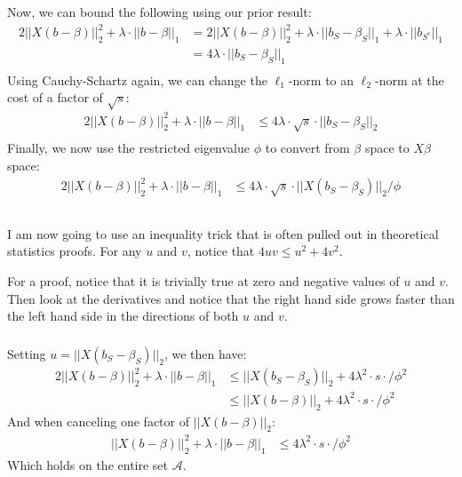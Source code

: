 \begin{frame}[fragile] \frametitle{}

Now, we can bound the following using our prior result:
\begin{align*}
2 || X ( b - \beta) ||_2^2 + \lambda \cdot || b - \beta ||_1
  &= 2 || X ( b - \beta) ||_2^2 + \lambda \cdot || b_S - \beta_S ||_1 + \lambda \cdot || b_{S^c} ||_1 \\
  &= 4 \lambda \cdot || b_S - \beta_S ||_1 \\
\end{align*}
\pause Using Cauchy-Schartz again, we can change the $\ell_1$-norm to an $\ell_2$-norm at
the cost of a factor of $\sqrt{s}$:
\begin{align*}
2 || X ( b - \beta) ||_2^2 + \lambda \cdot || b - \beta ||_1
  &\leq 4 \lambda \cdot \sqrt{s} \cdot || b_S - \beta_S ||_2 \\
\end{align*}
\pause Finally, we now use the restricted eigenvalue $\phi$ to convert from $\beta$ space
to $X \beta$ space:
\begin{align*}
2 || X ( b - \beta) ||_2^2 + \lambda \cdot || b - \beta ||_1
  &\leq 4 \lambda \cdot \sqrt{s} \cdot || X( b_S - \beta_S) ||_2 / \phi \\
\end{align*}

\end{frame}

\begin{frame}[fragile] \frametitle{}

I am now going to use an inequality trick that is often pulled out in
theoretical statistics proofs. For any $u$ and $v$, notice that
$4uv \leq u^2 + 4 v^2$.

For a proof, notice that it is trivially true at zero and negative values
of $u$ and $v$. Then look at the derivatives and notice that the right hand
side grows faster than the left hand side in the directions of both $u$ and
$v$.

\end{frame}


\begin{frame}[fragile] \frametitle{}

Setting $u = || X( b_S - \beta_S) ||_2$, we then have:
\begin{align*}
2 || X ( b - \beta) ||_2^2 + \lambda \cdot || b - \beta ||_1
  &\leq || X( b_S - \beta_S) ||_2 + 4 \lambda^2 \cdot s \cdot / \phi^2 \\
  &\leq || X( b - \beta) ||_2 + 4 \lambda^2 \cdot s \cdot / \phi^2
\end{align*}
And when canceling one factor of $|| X( b - \beta) ||_2$:
\begin{align*}
|| X ( b - \beta) ||_2^2 + \lambda \cdot || b - \beta ||_1
  &\leq 4 \lambda^2 \cdot s \cdot / \phi^2
\end{align*}
Which holds on the entire set $\mathcal{A}$.

\end{frame}

